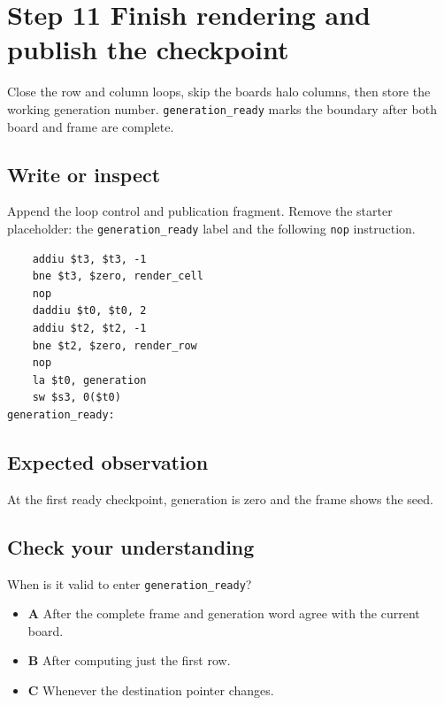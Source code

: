 \section{Step 11 Finish rendering and publish the
  checkpoint}\label{008-life-generations-s11-step-11-finish-rendering-and-publish-the-checkpoint}

Close the row and column loops, skip the board\textquotesingle s halo
columns, then store the working generation number.
\texttt{generation\_ready} marks the boundary after both board and frame
are complete.

\subsection{Write or
  inspect}\label{008-life-generations-s11-write-or-inspect}

Append the loop control and publication fragment.
Remove the starter placeholder: the \texttt{generation\_ready} label
and the following \texttt{nop} instruction.

\begin{verbatim}
    addiu $t3, $t3, -1
    bne $t3, $zero, render_cell
    nop
    daddiu $t0, $t0, 2
    addiu $t2, $t2, -1
    bne $t2, $zero, render_row
    nop
    la $t0, generation
    sw $s3, 0($t0)
generation_ready:
\end{verbatim}

\subsection{Expected
  observation}\label{008-life-generations-s11-expected-observation}

At the first ready checkpoint, generation is zero and the frame shows
the seed.

\subsection{Check your
  understanding}\label{008-life-generations-s11-check-your-understanding}

When is it valid to enter \texttt{generation\_ready}?

\begin{itemize}
  \tightlist
  \item
        \textbf{A} After the complete frame and generation word agree with the
        current board.
  \item
        \textbf{B} After computing just the first row.
  \item
        \textbf{C} Whenever the destination pointer changes.
\end{itemize}
